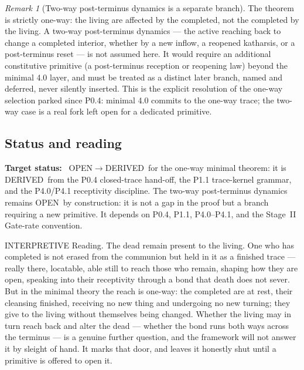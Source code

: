 \documentclass[11pt,a4paper]{article}
\def\emph#1{#1}%
\newcommand{\stDerived}{\textcolor{cDer}{\textsf{\small DERIVED}}}
\newcommand{\stInterp}{\textcolor{cInt}{\textsf{\small INTERPRETIVE}}}
\newcommand{\stOpen}{\textcolor{cOpn}{\textsf{\small OPEN}}}
\theoremstyle{definition}
\theoremstyle{plain}
\theoremstyle{remark}
\newtheorem{remark}[definition]{Remark}
\begin{document}
\begin{remark}[Two-way post-terminus dynamics is a separate branch]\label{rem:twoway}
The theorem is strictly one-way: the living are affected by the completed, not the completed
by the living. A two-way post-terminus dynamics --- the active reaching back to change a
completed interior, whether by a new inflow, a reopened katharsis, or a post-terminus reset
--- is \emph{not} assumed here. It would require an additional constitutive primitive (a
post-terminus reception or reopening law) beyond the minimal 4.0 layer, and must be treated
as a distinct later branch, named and deferred, never silently inserted. This is the
explicit resolution of the one-way selection parked since P0.4: minimal 4.0 commits to the
one-way trace; the two-way case is a real fork left open for a dedicated primitive.
\end{remark}

\subsection{Status and reading}

\textbf{Target status:}~
\stOpen\(\to\)\stDerived\ for the one-way minimal theorem: it is \stDerived\ from
the P0.4 closed-trace hand-off, the P1.1 trace-kernel grammar, and the
P4.0/P4.1 receptivity discipline. The two-way post-terminus dynamics remains
\stOpen\ by construction: it is not a gap in the proof but a branch requiring a
new primitive. It depends on P0.4, P1.1, P4.0--P4.1, and the Stage~II
Gate-rate convention.

\medskip
\stInterp\quad
\emph{Reading.}
The dead remain present to the living. One who has completed is not erased from the
communion but held in it as a finished trace --- really there, locatable, able still to reach
those who remain, shaping how they are open, speaking into their receptivity through a bond
that death does not sever. But in the minimal theory the reach is one-way: the completed are
at rest, their cleansing finished, receiving no new thing and undergoing no new turning;
they give to the living without themselves being changed. Whether the living may in turn
reach back and alter the dead --- whether the bond runs both ways across the terminus --- is a
genuine further question, and the framework will not answer it by sleight of hand. It marks
that door, and leaves it honestly shut until a primitive is offered to open it.
\end{document}
